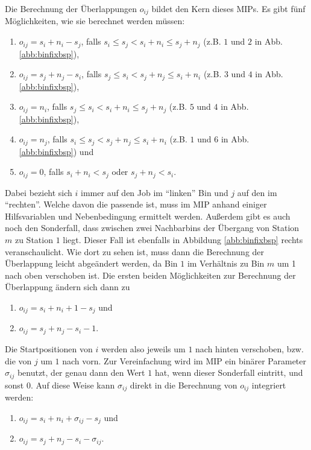 \documentclass{scrreprt}
\begin{document}
Die Berechnung der Überlappungen $o_{ij}$ bildet den Kern dieses MIPs.
Es gibt fünf Möglichkeiten, wie sie berechnet werden müssen:
\begin{enumerate}
    \item $o_{ij} = s_i + n_i - s_j$, falls $s_i\leq s_j<s_i+n_i\leq s_j+n_j$ (z.B. $1$ und $2$ in Abb. \ref{abb:binfixbsp}),
    \item $o_{ij} = s_j + n_j - s_i$, falls $s_j\leq s_i<s_j+n_j\leq s_i+n_i$ (z.B. $3$ und $4$ in Abb. \ref{abb:binfixbsp}),
    \item $o_{ij} = n_i$, falls $s_j\leq s_i<s_i+n_i\leq s_j+n_j$ (z.B. $5$ und $4$ in Abb. \ref{abb:binfixbsp}),
    \item $o_{ij} = n_j$, falls $s_i\leq s_j<s_j+n_j\leq s_i+n_i$ (z.B. $1$ und $6$ in Abb. \ref{abb:binfixbsp}) und
    \item $o_{ij} = 0$, falls $s_i+n_i<s_j$ oder $s_j+n_j<s_i$.
\end{enumerate}
Dabei bezieht sich $i$ immer auf den Job im "`linken"' Bin und $j$ auf den im "`rechten"'.
Welche davon die passende ist, muss im MIP anhand einiger Hilfsvariablen und Nebenbedingung ermittelt werden.
Außerdem gibt es auch noch den Sonderfall, dass zwischen zwei Nachbarbins der Übergang von Station $m$ zu Station $1$ liegt.
Dieser Fall ist ebenfalls in Abbildung \ref{abb:binfixbsp} rechts veranschaulicht.
Wie dort zu sehen ist, muss dann die Berechnung der Überlappung leicht abgeändert werden, da Bin $1$ im Verhältnis zu Bin $m$ um 1 nach oben verschoben ist.
Die ersten beiden Möglichkeiten zur Berechnung der Überlappung ändern sich dann zu
\begin{enumerate}
    \item $o_{ij} = s_i + n_i + 1 - s_j$ und 
    \item $o_{ij} = s_j + n_j - s_i - 1$.
\end{enumerate}
Die Startpositionen von $i$ werden also jeweils um $1$ nach hinten verschoben, bzw. die von $j$ um $1$ nach vorn.
Zur Vereinfachung wird im MIP ein binärer Parameter $\sigma_{ij}$ benutzt, der genau dann den Wert $1$ hat, wenn dieser Sonderfall eintritt, und sonst $0$.
Auf diese Weise kann $\sigma_{ij}$ direkt in die Berechnung von $o_{ij}$ integriert werden:
\begin{enumerate}
    \item $o_{ij} = s_i + n_i + \sigma_{ij} - s_j$ und 
    \item $o_{ij} = s_j + n_j - s_i - \sigma_{ij}$.
\end{enumerate}
\end{document}
